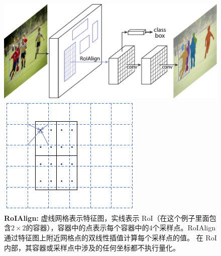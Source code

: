 \begin{figure}
\begin{minipage}{0.45\textwidth}
  \centering
  \includegraphics[width=1\linewidth]{figures/mask_rcnn/teaser}\vspace{2mm}
  \caption{用于实例分割的\textbf{Mask\hspace{0.1297em}R-CNN}框架。}
  \label{fig:teaser}
\end{minipage}\hspace{1.5em}
\begin{minipage}{0.5\textwidth}
  \begin{minipage}{0.365\linewidth}
  \includegraphics[width=\textwidth,trim={0 0 7.5mm 0},clip]{figures/mask_rcnn/roialign}
  \end{minipage}\hspace{0.5em}
  \begin{minipage}{0.605\linewidth}
  \caption{\textbf{RoIAlign:} 虚线网格表示特征图，实线表示 RoI（在这个例子里面包含$2\times2$的容器），容器中的点表示每个容器中的4个采样点。RoIAlign通过特征图上附近网格点的双线性插值计算每个采样点的值。 在 RoI 内部，其容器或采样点中涉及的任何坐标都不执行量化。}
  \label{fig:roialign}
  \end{minipage}
\end{minipage}
\end{figure}

